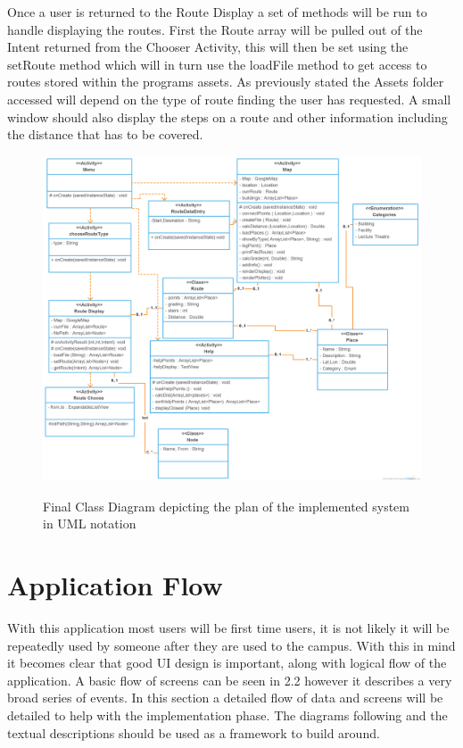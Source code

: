 Once a user is returned to the Route Display a set of methods will be run to handle displaying the routes. First the Route array will be pulled out of the Intent returned from the Chooser Activity, this will then be set using the setRoute method which will in turn use the loadFile method to get access to routes stored within the programs assets. As previously stated the Assets folder accessed will depend on the type of route finding the user has requested. A small window should also display the steps on a route and other information including the distance that has to be covered. 


\begin{figure}
\includegraphics[scale=0.25]{Chapter2/class.png} \\
\caption[Class Diagram]{Final Class Diagram depicting the plan of the implemented system in UML notation}
\end{figure}
\newpage
\section{Application Flow}
With this application most users will be first time users, it is not likely it will be repeatedly used by someone after they are used to the campus. With this in mind it becomes clear that good UI design is important, along with logical flow of the application. A basic flow of screens can be seen in 2.2 however it describes a very broad series of events. In this section a detailed flow of data and screens will be detailed to help with the implementation phase. The diagrams following and the textual descriptions should be used as a framework to build around. 
